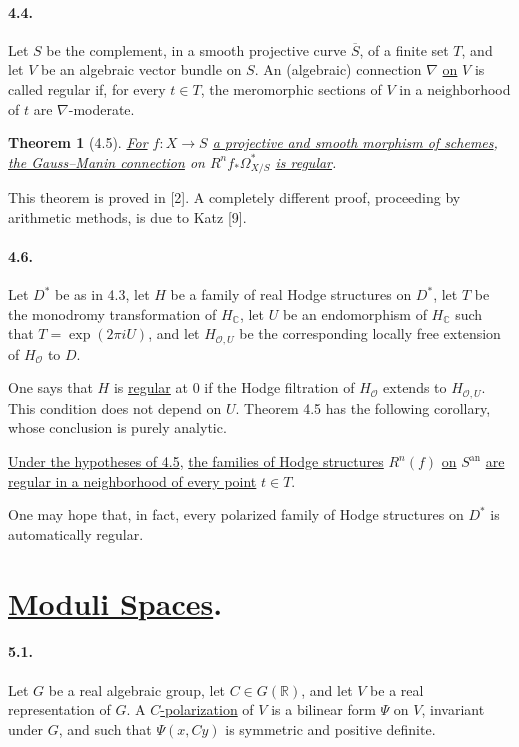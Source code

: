 \documentclass[10pt,leqno]{article}
\newcommand{\C}{\mathbb C}
\newcommand{\R}{\mathbb R}
\newcommand{\cO}{\mathcal O}
\theoremstyle{deligne}
\newtheorem*{theorem}{Theorem}
\renewcommand{\underline}[1]{\uline{#1}}
\begin{document}
\paragraph{4.4.}
Let $S$ be the complement, in a smooth projective curve $\overline S$, of a finite set $T$, and let $V$ be an algebraic vector bundle on $S$. An (algebraic) connection $\nabla$ \underline{on} $V$ is called regular if, for every $t\in T$, the meromorphic sections of $V$ in a neighborhood of $t$ are $\nabla$-moderate.

\begin{theorem}[4.5]
\underline{For} $f:X\to S$ \underline{a projective and smooth morphism of schemes}, \underline{the Gauss--Manin connection} on $R^n f_*\Omega^*_{X/S}$ \underline{is regular}.
\end{theorem}

This theorem is proved in [2]. A completely different proof, proceeding by arithmetic methods, is due to Katz [9].

\paragraph{4.6.}
Let $D^*$ be as in 4.3, let $H$ be a family of real Hodge structures on $D^*$, let $T$ be the monodromy transformation of $H_\C$, let $U$ be an endomorphism of $H_\C$ such that $T=\exp(2\pi iU)$, and let $H_{\cO,U}$ be the corresponding locally free extension of $H_\cO$ to $D$.

One says that $H$ is \underline{regular} at $0$ if the Hodge filtration of $H_\cO$ extends to $H_{\cO,U}$. This condition does not depend on $U$. Theorem 4.5 has the following corollary, whose conclusion is purely analytic.

\begin{corollary}[4.7]
\underline{Under the hypotheses of 4.5}, \underline{the families of Hodge structures} $R^n(f)$ \underline{on} $S^{\mathrm{an}}$ \underline{are regular in a neighborhood of every point} $t\in T$.
\end{corollary}

One may hope that, in fact, every polarized family of Hodge structures on $D^*$ is automatically regular.

\section{\underline{Moduli Spaces}.}

\paragraph{5.1.}
Let $G$ be a real algebraic group, let $C\in G(\R)$, and let $V$ be a real representation of $G$. A $C$\underline{-polarization} of $V$ is a bilinear form $\Psi$ on $V$, invariant under $G$, and such that $\Psi(x,Cy)$ is symmetric and positive definite.
\end{document}
